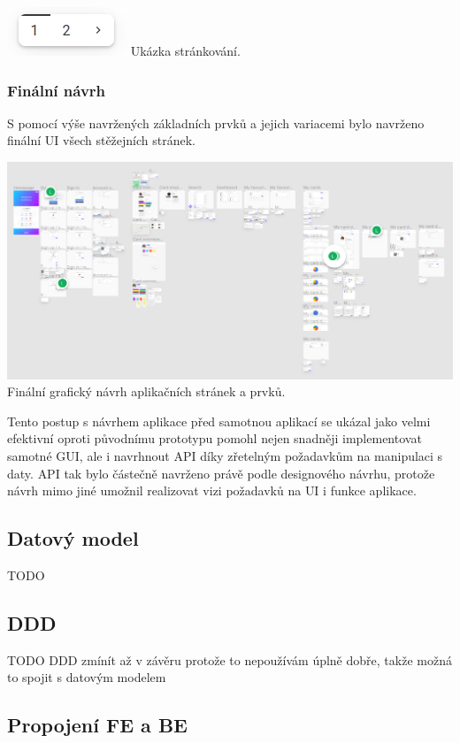 \begin{itemize}
\begin{itemize}
			\includegraphics[width=0.24\linewidth]{obrazky/strankovani}\hfill
			Ukázka stránkování. %

		\subsubsection{Finální návrh}

		S pomocí výše navržených základních prvků a jejich variacemi bylo navrženo finální \ac{UI} všech stěžejních
		stránek.

		\includegraphics[width=0.24\linewidth]{obrazky/finalni_navrh}\hfill
		Finální grafický návrh aplikačních stránek a prvků. %

		Tento postup s návrhem aplikace před samotnou aplikací se ukázal jako velmi efektivní oproti původnímu prototypu
		pomohl nejen snadněji implementovat samotné \ac{GUI}, ale i navrhnout \ac{API} díky zřetelným požadavkům na
		manipulaci s daty.
		\ac{API} tak bylo částečně navrženo právě podle designového návrhu, protože návrh mimo jiné umožnil realizovat
		vizi požadavků na \ac{UI} i funkce aplikace.

	\subsection{Datový model}

	TODO

	\subsection{DDD}

	TODO
	DDD zmínít až v závěru protože to nepoužívám úplně dobře, takže možná to spojit s datovým modelem

	\subsection{Propojení FE a BE}


\end{itemize}
\end{itemize}
